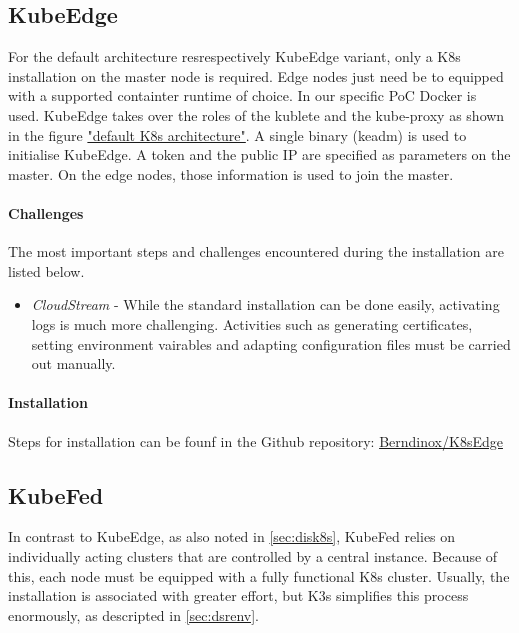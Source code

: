 \documentclass[MSC,Master,english]{twbook}%
\begin{document}
\subsection{KubeEdge}
\label{sec:dsrenvke}
For the default architecture resrespectively KubeEdge variant, only a \ac{K8s} installation on the master node is required. Edge nodes just need be to equipped with a supported containter runtime of choice. In our specific \ac{PoC} Docker is used. KubeEdge takes over the roles of the kublete and the kube-proxy as shown in the figure \hyperref[fig:k8s-default]{"default K8s architecture"}. A single binary (keadm) is used to initialise KubeEdge. A token and the public IP are specified as parameters on the master. On the edge nodes, those information is used to join the master. 

\paragraph{Challenges} The most important steps and challenges encountered during the installation are listed below.

\begin{itemize}
    \item \textit{CloudStream} - While the standard installation can be done easily, activating logs is much more challenging. Activities such as generating certificates, setting environment vairables and adapting configuration files must be carried out manually.
\end{itemize}

\paragraph{Installation} Steps for installation can be founf in the Github repository: \hyperref{https://github.com/Berndinox/K8sEdge/blob/main/DOCs/kubeedge-install.md}{}{}{Berndinox/K8sEdge}

\subsection{KubeFed}
\label{sec:dsrenvkf}
In contrast to KubeEdge, as also noted in \autoref{sec:disk8s}, KubeFed relies on individually acting clusters that are controlled by a central instance. Because of this, each node must be equipped with a fully functional \ac{K8s} cluster. Usually, the installation is associated with greater effort, but K3s simplifies this process enormously, as descripted in \autoref{sec:dsrenv}. 
\end{document}
